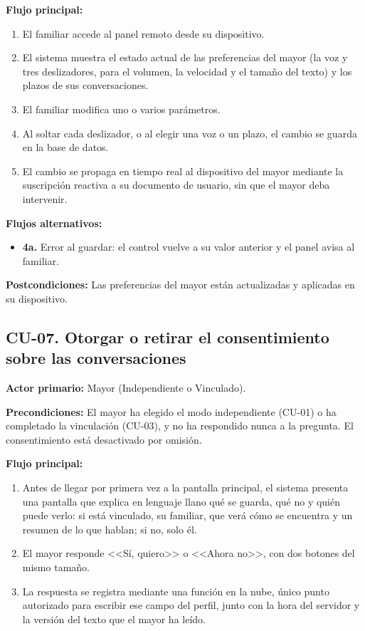 \noindent\textbf{Flujo principal:}
\begin{enumerate}[nosep]
    \item El familiar accede al panel remoto desde su dispositivo.
    \item El sistema muestra el estado actual de las preferencias del mayor (la voz y tres deslizadores, para el volumen, la velocidad y el tamaño del texto) y los plazos de sus conversaciones.
    \item El familiar modifica uno o varios parámetros.
    \item Al soltar cada deslizador, o al elegir una voz o un plazo, el cambio se guarda en la base de datos.
    \item El cambio se propaga en tiempo real al dispositivo del mayor mediante la suscripción reactiva a su documento de usuario, sin que el mayor deba intervenir.
\end{enumerate}

\noindent\textbf{Flujos alternativos:}
\begin{itemize}[nosep]
    \item \textbf{4a.} Error al guardar: el control vuelve a su valor anterior y el panel avisa al familiar.
\end{itemize}

\noindent\textbf{Postcondiciones:} Las preferencias del mayor están actualizadas y aplicadas en su dispositivo.

\bigskip

\subsection*{CU-07. Otorgar o retirar el consentimiento sobre las conversaciones}

\noindent\textbf{Actor primario:} Mayor (Independiente o Vinculado).

\noindent\textbf{Precondiciones:} El mayor ha elegido el modo independiente (CU-01) o ha completado la vinculación (CU-03), y no ha respondido nunca a la pregunta. El consentimiento está desactivado por omisión.

\noindent\textbf{Flujo principal:}
\begin{enumerate}[nosep]
    \item Antes de llegar por primera vez a la pantalla principal, el sistema presenta una pantalla que explica en lenguaje llano qué se guarda, qué no y quién puede verlo: si está vinculado, su familiar, que verá cómo se encuentra y un resumen de lo que hablan; si no, solo él.
    \item El mayor responde <<Sí, quiero>> o <<Ahora no>>, con dos botones del mismo tamaño.
    \item La respuesta se registra mediante una función en la nube, único punto autorizado para escribir ese campo del perfil, junto con la hora del servidor y la versión del texto que el mayor ha leído.
\end{enumerate}

